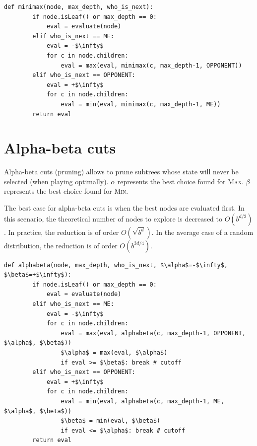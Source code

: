 \begin{algorithm}
\caption{Minimax algorithm}
\begin{lstlisting}[mathescape=true]
    def minimax(node, max_depth, who_is_next):
        if node.isLeaf() or max_depth == 0: 
            eval = evaluate(node)
        elif who_is_next == ME:
            eval = -$\infty$
            for c in node.children:
                eval = max(eval, minimax(c, max_depth-1, OPPONENT))
        elif who_is_next == OPPONENT:
            eval = +$\infty$
            for c in node.children:
                eval = min(eval, minimax(c, max_depth-1, ME))
        return eval
\end{lstlisting}
\end{algorithm}


\section{Alpha-beta cuts}
Alpha-beta cuts (pruning) allows to prune subtrees whose state will never be selected (when playing optimally).
$\alpha$ represents the best choice found for \textsc{Max}.
$\beta$ represents the best choice found for \textsc{Min}.

The best case for alpha-beta cuts is when the best nodes are evaluated first.
In this scenario, the theoretical number of nodes to explore is decreased to $O(b^{d/2})$.
In practice, the reduction is of order $O(\sqrt{b^d})$.
In the average case of a random distribution, the reduction is of order $O(b^{3d/4})$.

\begin{algorithm}
\caption{Minimax with alpha-beta cuts}
\begin{lstlisting}[mathescape=true]
    def alphabeta(node, max_depth, who_is_next, $\alpha$=-$\infty$, $\beta$=+$\infty$):
        if node.isLeaf() or max_depth == 0: 
            eval = evaluate(node)
        elif who_is_next == ME:
            eval = -$\infty$
            for c in node.children:
                eval = max(eval, alphabeta(c, max_depth-1, OPPONENT, $\alpha$, $\beta$))
                $\alpha$ = max(eval, $\alpha$)
                if eval >= $\beta$: break # cutoff
        elif who_is_next == OPPONENT:
            eval = +$\infty$
            for c in node.children:
                eval = min(eval, alphabeta(c, max_depth-1, ME, $\alpha$, $\beta$))
                $\beta$ = min(eval, $\beta$)
                if eval <= $\alpha$: break # cutoff
        return eval
\end{lstlisting}
\end{algorithm}

